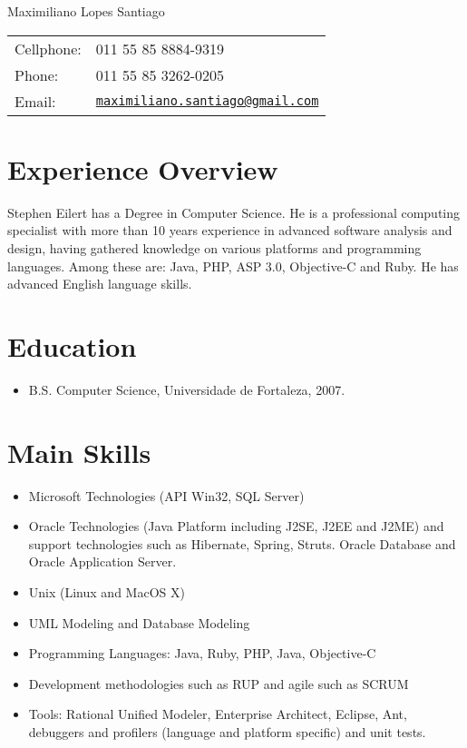 \documentclass[letterpaper]{article}
\def\name{Maximiliano Lopes Santiago}
\begin{document}
\begin{flushright}

{\huge \name}


\vspace{0.25in}
\begin{minipage}{0.45\linewidth}
  \begin{tabular}{ll}
    Cellphone: & 011 55 85 8884-9319 \\
    Phone: &  011 55 85 3262-0205 \\
    Email: & \href{mailto:maximiliano.santiago@gmail.com}{\tt maximiliano.santiago@gmail.com} \\
  \end{tabular}
\end{minipage}
\end{flushright}
\section*{Experience Overview}

Stephen Eilert has a Degree in Computer Science. He is a professional computing
specialist with more than 10 years experience in advanced software analysis and design,
having gathered knowledge on various platforms and programming languages. Among these
are: Java, PHP, ASP 3.0, Objective-C and Ruby.
He has advanced English language skills.


\section*{Education}

\begin{itemize}
  \item B.S. Computer Science, Universidade de Fortaleza, 2007.
\end{itemize}

\section*{Main Skills}
\begin{itemize}
  \item Microsoft Technologies (API Win32, SQL Server)
  \item Oracle Technologies (Java Platform including J2SE, J2EE and J2ME) and support
    technologies such as Hibernate, Spring, Struts.
    Oracle Database and Oracle Application Server.
  \item Unix (Linux and MacOS X)
  \item UML Modeling and Database Modeling
  \item Programming Languages: Java, Ruby, PHP, Java, Objective-C
  \item Development methodologies such as RUP and agile such as SCRUM
  \item Tools: Rational Unified Modeler, Enterprise Architect, Eclipse, Ant, debuggers and profilers (language and platform
specific) and unit tests.
\end{itemize}
\end{document}
